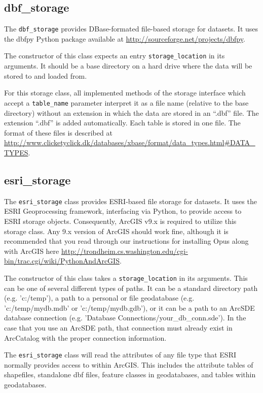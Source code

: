 {\subsection{dbf_storage}
%
The \verb|dbf_storage| provides DBase-formated file-based storage for
datasets.  It uses the dbfpy Python package available at
\url{http://sourceforge.net/projects/dbfpy}.

The constructor of this class expects an entry \verb|storage_location| in its
arguments. It should be a base directory on a hard drive where
the data will be stored to and loaded from.

For this storage class, all implemented methods of the storage interface which
accept a \verb|table_name| parameter interpret it as a file name (relative to the
base directory) without an extension in which the data are stored in an ``.dbf''
file.  The extension ``.dbf'' is added automatically. Each table is stored in one
file. The format of these files is described at
\url{http://www.clicketyclick.dk/databases/xbase/format/data_types.html\#DATA_TYPES}.

\subsection{esri_storage}
%
The \verb|esri_storage| class provides ESRI-based file storage for datasets.  It uses the 
ESRI Geoprocessing framework, interfacing via Python, to provide access to ESRI storage
objects.  Consequently, ArcGIS v9.x is required to utilize this storage class.  Any 9.x version
of ArcGIS should work fine, although it is recommended that you read through our instructions
for installing Opus along with ArcGIS here
\url{http://trondheim.cs.washington.edu/cgi-bin/trac.cgi/wiki/PythonAndArcGIS}.

The constructor of this class takes a \verb|storage_location| in its arguments.  This
can be one of several different types of paths.  It can be a standard directory path (e.g. 
'c:/temp'), a path to a personal or file geodatabase (e.g. 'c:/temp/mydb.mdb' or 'c:/temp/mydb.gdb'), or
it can be a path to an ArcSDE database connection (e.g. 'Database Connections/your_db_conn.sde').
In the case that you use an ArcSDE path, that connection must already exist in ArcCatalog with the 
proper connection information.

The \verb|esri_storage| class will read the attributes of any file type that ESRI normally provides 
access to within ArcGIS.  This includes the attribute tables of shapefiles, standalone
dbf files, feature classes in geodatabases, and tables within geodatabases.

}
